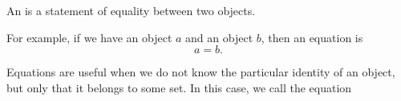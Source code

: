 
\sbasic



\sstart
{}



An  is
a statement of equality between
two objects.

For example, if we have an object $a$
and an object $b$, then an equation
is
\[
  a = b.
\]

Equations are useful when we do not
know the particular identity of an
object, but only that it belongs to
some set.
In this case, we call the
equation 
\strats
